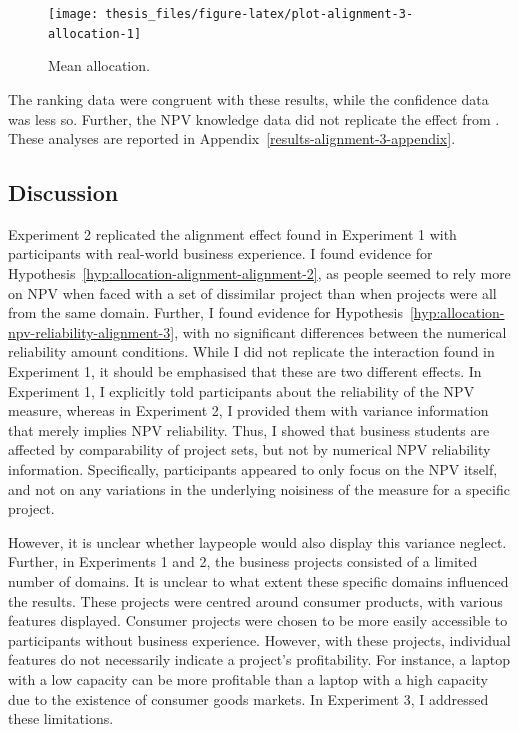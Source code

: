 \documentclass[a4paper, nobind, dvipsnames]{templates/ociamthesis}
\theoremstyle{definition}
\theoremstyle{definition}
\theoremstyle{definition}
\theoremstyle{definition}
\theoremstyle{remark}
\begin{document}
\begin{figure}
\texttt{[image: thesis\_files/figure-latex/plot-alignment-3-allocation-1]} \caption{Mean allocation.}\label{fig:plot-alignment-3-allocation}
\end{figure}

The ranking data were congruent with these results, while the confidence data
was less so. Further, the NPV knowledge data did not replicate the effect from
\textcite[Study 1]{long2018}. These analyses are reported in
Appendix~\ref{results-alignment-3-appendix}.

\subsection{Discussion}

Experiment 2 replicated the alignment effect found in Experiment 1 with
participants with real-world business experience. I found evidence for
Hypothesis~\ref{hyp:allocation-alignment-alignment-2}, as people seemed to rely
more on NPV when faced with a set of dissimilar project than when projects were
all from the same domain. Further, I found evidence for
Hypothesis~\ref{hyp:allocation-npv-reliability-alignment-3}, with no
significant differences between the numerical reliability amount conditions.
While I did not replicate the interaction found in Experiment 1, it should be
emphasised that these are two different effects. In Experiment 1, I explicitly
told participants about the reliability of the NPV measure, whereas in
Experiment 2, I provided them with variance information that merely implies NPV
reliability. Thus, I showed that business students are affected by comparability
of project sets, but not by numerical NPV reliability information. Specifically,
participants appeared to only focus on the NPV itself, and not on any variations
in the underlying noisiness of the measure for a specific project.

However, it is unclear whether laypeople would also display this variance
neglect. Further, in Experiments 1 and 2, the business projects consisted of
a limited number of domains. It is unclear to what extent these specific domains
influenced the results. These projects were centred around consumer products,
with various features displayed. Consumer projects were chosen to be more easily
accessible to participants without business experience. However, with these
projects, individual features do not necessarily indicate a project's
profitability. For instance, a laptop with a low capacity can be more profitable
than a laptop with a high capacity due to the existence of consumer goods
markets. In Experiment 3, I addressed these limitations.
\end{document}
